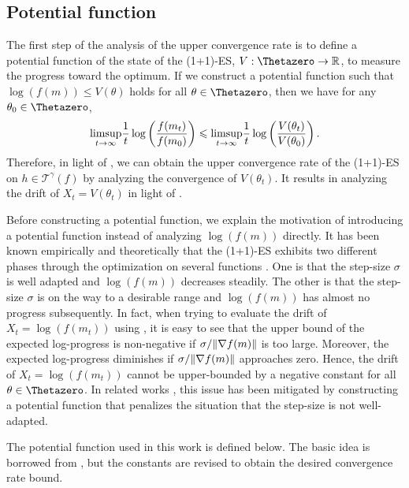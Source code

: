 \documentclass[journal]{IEEEtran}
\providecommand{\limsup}{\operatornamewithlimits{limsup}} %
\providecommand{\R}{\mathbb{R}} %
\renewcommand{\leq}{\leqslant} %
\DeclarePairedDelimiter{\norm}{\lVert}{\rVert}
\theoremstyle{definition}
\begin{document}
\subsection{Potential function}\label{subsec:potentialfunction}

The first step of the analysis of the upper convergence rate is to define a potential function of the state of the (1+1)-ES, $V:\Thetazero \to \R$, to measure the progress toward the optimum.
If we construct a potential function such that $\log(f(m))\leq V(\theta)$ holds for all $\theta \in \Thetazero$, then we have for any $\theta_0 \in \Thetazero$,
\begin{equation}
\underset{t\to\infty}{\limsup}\frac{1}{t}\log\left(\frac{f(m_t)}{f(m_0)}\right)
\leq
\underset{t\to\infty}{\limsup}\frac{1}{t}\log\left(\frac{V(\theta_t)}{V(\theta_0)}\right)
.
\end{equation}
Therefore, in light of , we can obtain the upper convergence rate of the (1+1)-ES on $h \in \mathcal{T}^{\gamma}(f)$ by analyzing the convergence of $V(\theta_t)$. 
It results in analyzing the drift of $X_t = V(\theta_t)$ in light of .

Before constructing a potential function, we explain the motivation of introducing a potential function instead of analyzing $\log(f(m))$ directly.
It has been known empirically and theoretically that the (1+1)-ES exhibits two different phases through the optimization on several functions \cite{akimoto2018drift,akimoto2020global,morinaga2019generalized}.
One is that the step-size $\sigma$ is well adapted and $\log(f(m))$ decreases steadily. 
The other is that the step-size $\sigma$ is on the way to a desirable range and $\log(f(m))$ has almost no progress subsequently.
In fact, when trying to evaluate the drift of $X_t = \log(f(m_t))$ using , it is easy to see that the upper bound of the expected log-progress is non-negative if $\sigma / \norm{\nabla f(m)}$ is too large. 
Moreover, the expected log-progress diminishes if $\sigma / \norm{\nabla f(m)}$ approaches zero.
Hence, the drift of $X_t = \log(f(m_t))$ cannot be upper-bounded by a negative constant for all $\theta \in \Thetazero$. 
In related works \cite{akimoto2018drift,akimoto2020global,morinaga2019generalized}, this issue has been mitigated by constructing a potential function that penalizes the situation that the step-size is not well-adapted.

The potential function used in this work is defined below. The basic idea is borrowed from \cite{morinaga2019generalized,morinaga2021convergence}, but the constants are revised to obtain the desired convergence rate bound.
\end{document}
